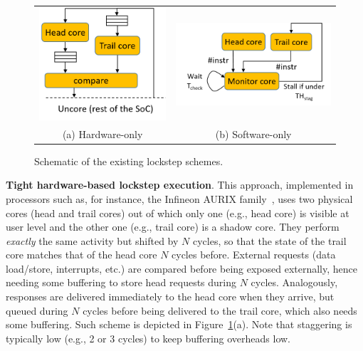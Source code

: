 \begin{figure}[t!]
\centering
\begin{tabular}{cc}
  \includegraphics[width=0.37\columnwidth]{imgs/HWlockstep.png} & 
  \includegraphics[width=0.53\columnwidth]{imgs/SWlockstep.png} \\
  (a) Hardware-only & (b) Software-only \\
\end{tabular}
  \caption{Schematic of the existing lockstep schemes.}
  \label{fig:HWSWlockstep}
\end{figure}

\textbf{Tight hardware-based lockstep execution}. This approach, implemented in processors such as, for instance, the Infineon AURIX family~\cite{infineon_aurix}, uses two physical cores (head and trail cores) out of which only one (e.g., head core) is visible at user level and the other one (e.g., trail core) is a shadow core. They perform \emph{exactly} the same activity but shifted by $N$ cycles, 
so that the state of the trail core matches that of the head core $N$ cycles before.
External requests (data load/store, interrupts, etc.) are compared before being exposed externally, hence needing some buffering to store head requests during $N$ cycles. Analogously, responses are delivered immediately to the head core when they arrive, but queued during $N$ cycles before being delivered to the trail core, which also needs some buffering. Such scheme is depicted in Figure~\ref{fig:HWSWlockstep}(a). Note that staggering is typically low (e.g., 2 or 3 cycles) to keep buffering overheads low.

